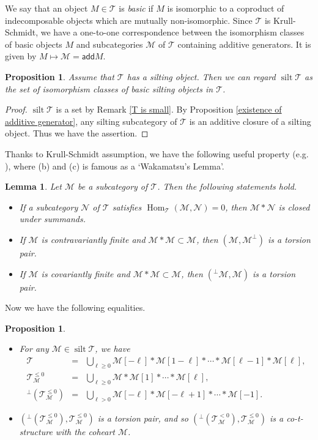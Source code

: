 \documentclass[a4paper,reqno]{amsart}
\newtheorem{lemma}[theorem]{Lemma}
\newtheorem{proposition}[theorem]{Proposition}
\theoremstyle{definition}
\newcommand{\TT}{{\mathcal T}}
\newcommand{\MM}{{\mathcal M}}
\newcommand{\NN}{{\mathcal N}}
\newcommand{\add}{\mathsf{add}}
\newcommand{\Hom}{\operatorname{Hom}\nolimits}
\newcommand{\silt}{\operatorname{silt}\nolimits}
\begin{document}
We say that an object $M\in\TT$ is \emph{basic} if $M$ is isomorphic to
a coproduct of indecomposable objects which are mutually non-isomorphic.
Since $\TT$ is Krull-Schmidt, we have a one-to-one correspondence
between the isomorphism classes of basic objects $M$ and subcategories $\MM$ of $\TT$
containing additive generators. It is given by $M\mapsto\MM=\add M$.

\begin{proposition}
Assume that $\TT$ has a silting object.
Then we can regard $\silt\TT$ as the set of isomorphism classes of basic silting objects in $\TT$.
\end{proposition}

\begin{proof}
$\silt\TT$ is a set by Remark \ref{T is small}.
By Proposition \ref{existence of additive generator}, any silting subcategory of $\TT$ is an additive closure of a silting object.
Thus we have the assertion.
\end{proof}

Thanks to Krull-Schmidt assumption, we have the following useful property (e.g. \cite[2.1, 2.3]{IY}),
where (b) and (c) is famous as a `Wakamatsu's Lemma'.

\begin{lemma}\label{direct summand}
Let $\MM$ be a subcategory of $\TT$.
Then the following statements hold.
\begin{itemize}
\item[(a)] If a subcategory $\NN$ of $\TT$ satisfies $\Hom_{\TT}(\MM,\NN)=0$, 
then $\MM*\NN$ is closed under summands.
\item[(b)] If $\MM$ is contravariantly finite and $\MM*\MM\subset\MM$, 
then $(\MM, \MM^{\perp})$ is a torsion pair.
\item[(c)] If $\MM$ is covariantly finite and $\MM*\MM\subset\MM$, 
then $({}^{\perp}\MM, \MM)$ is a torsion pair. 
\end{itemize}
\end{lemma}

Now we have the following equalities.

\begin{proposition}\label{generate3}
\begin{itemize}
\item[(a)] For any $\MM\in\silt\TT$, we have
\begin{eqnarray*}%
\TT&=&\bigcup_{\ell\ge0}\MM[-\ell]*\MM[1-\ell]*\cdots*\MM[\ell-1]*\MM[\ell],\\ %
\TT_{\MM}^{\le0}&=&\bigcup_{\ell\ge0}\MM*\MM[1]*\cdots*\MM[\ell],\\ 
{}^{\perp}(\TT^{\leq 0}_{\MM})&=&\bigcup_{\ell>0}\MM[-\ell]*\MM[-\ell+1]*\cdots*\MM[-1].
\end{eqnarray*}
\item[(b)] $({}^{\perp}(\TT^{\leq 0}_{\MM}), \TT^{\leq 0}_{\MM})$ is a torsion pair, and so $({}^{\perp}(\TT^{<0}_{\MM}), \TT^{\leq 0}_{\MM})$ is a co-t-structure with the coheart $\MM$.
\end{itemize}
\end{proposition}
\end{document}
